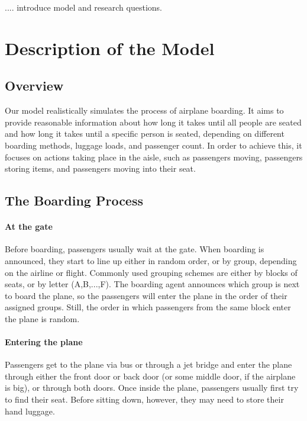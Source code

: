 \documentclass[11pt]{article}
\begin{document}
.... introduce model and research questions. 










\section{Description of the Model}

\subsection{Overview}

Our model realistically simulates the process of airplane boarding. It aims to provide reasonable information about how long it takes until all people are seated and how long it takes until a specific person is seated, depending on different boarding methods, luggage loads, and passenger count.  In order to achieve this, it focuses on actions taking place in the aisle, such as passengers moving, passengers storing items, and passengers moving into their seat.


\subsection{The Boarding Process}
\paragraph{At the gate}
Before boarding, passengers usually wait at the gate. When boarding is announced, they start to line up either in random order, or by group, depending on the airline or flight. Commonly used grouping schemes are either by blocks of seats, or by letter (A,B,...,F). The boarding agent announces which group is next to board the plane, so the passengers will enter the plane in the order of their assigned groups. Still, the order in which passengers from the same block enter the plane is random. 

\paragraph{Entering the plane}
Passengers get to the plane via bus or through a jet bridge and enter the plane through either the front door or back door (or some middle door, if the airplane is big), or through both doors. Once inside the plane, passengers usually first try to find their seat.  Before sitting down, however, they may need to store their hand luggage. 
\end{document}
